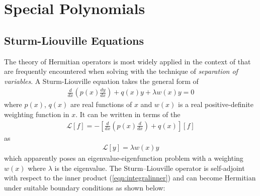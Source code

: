 \section{Special Polynomials}

\subsection{Sturm-Liouville Equations}

The theory of Hermitian operators is most widely applied in the context of  that are frequently encountered when solving  with the technique of \textit{separation of variables}. A Sturm-Liouville equation takes the general form of
\begin{align}
\frac{d}{dx} (p(x) \frac{dy}{dx}) + q(x) y + \lambda w(x)y = 0
\end{align}
where $p(x)$, $q(x)$ are real functions of $x$ and $w(x)$ is a real positive-definite weighting function in $x$. It can be written in terms of the 
\begin{align}
\mathcal{L}[f] = -[\frac{d}{dx} (p(x) \frac{d}{dx}) + q(x)][f]    
\end{align}
as
\begin{align}
\mathcal{L}[y] = \lambda w(x)y
\end{align}
which apparently poses an eigenvalue-eigenfunction problem with a weighting $w(x)$ where $\lambda$ is the eigenvalue. The Sturm–Liouville operator is self-adjoint with respect to the inner product (\ref{eqn:integralinner}) and can become Hermitian under suitable boundary conditions as shown below:
